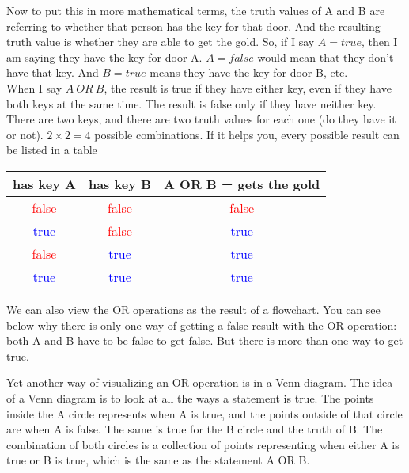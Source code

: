 \begin{center} \end{center}

Now to put this in more mathematical terms, the truth values of A and B are referring to whether that person has the key for that door. And the resulting truth value is whether they are able to get the gold. So, if I say \(A=true\), then I am saying they have the key for door A. \(A=false\) would mean that they don't have that key. And \(B=true\) means they have the key for door B, etc.\\

When I say \(A\: OR \: B\), the result is true if they have either key, even if they have both keys at the same time. The result is false only if they have neither key. There are two keys, and there are two truth values for each one (do they have it or not). \(2 \times 2 = 4\) possible combinations. If it helps you, every possible result can be listed in a table\\

\begin{center}
	\begin{tabular}{c | c | c}
		has key A & has key B & A OR B = gets the gold\\ \hline
		\textcolor{red}{false} & \textcolor{red}{false} & \textcolor{red}{false}\\ \hline
		\textcolor{blue}{true} & \textcolor{red}{false} & \textcolor{blue}{true} \\ \hline
		\textcolor{red}{false} & \textcolor{blue}{true} & \textcolor{blue}{true} \\ \hline
		\textcolor{blue}{true} & \textcolor{blue}{true} &\textcolor{blue} {true} \\ \hline
	\end{tabular}
\end{center}

We can also view the OR operations as the result of a flowchart. You can see below why there is only one way of getting a false result with the OR operation: both A and B have to be false to get false. But there is more than one way to get true.

\begin{center} \end{center}

Yet another way of visualizing an OR operation is in a Venn diagram. The idea of a Venn diagram is to look at all the ways a statement is true. The points inside the A circle represents when A is true, and the points outside of that circle are when A is false. The same is true for the B circle and the truth of B. The combination of both circles is a collection of points representing when either A is true or B is true, which is the same as the statement A OR B.


